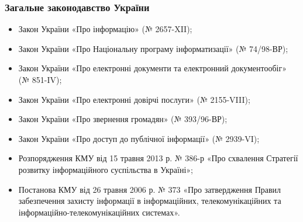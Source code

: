 \documentclass{article}
\begin{document}
\subsubsection{Загальне законодавство України}
\begin{itemize}
    \item Закон України «Про інформацію» (№ 2657-XII);
    \item Закон України «Про Національну програму інформатизації» (№ 74/98-ВР);
    \item Закон України «Про електронні документи та електронний документообіг» (№ 851-IV);
    \item Закон України «Про електронні довірчі послуги» (№ 2155-VIII);
    \item Закон України «Про звернення громадян» (№ 393/96-ВР);
    \item Закон України «Про доступ до публічної інформації» (№ 2939-VI);
    \item Розпорядження КМУ від 15 травня 2013 р. № 386-р «Про схвалення Стратегії розвитку інформаційного суспільства в Україні»;
    \item Постанова КМУ від 26 травня 2006 р. № 373 «Про затвердження Правил забезпечення захисту інформації в інформаційних, телекомунікаційних та інформаційно-телекомунікаційних системах».
\end{itemize}
\end{document}
